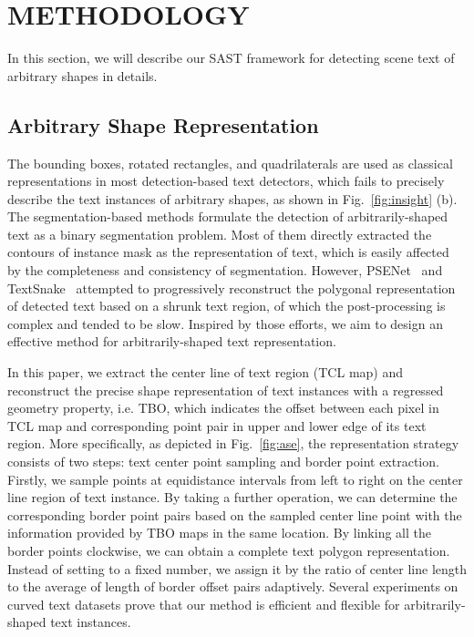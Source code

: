 \documentclass[sigconf]{acmart}
\begin{document}
\section{METHODOLOGY}
In this section, we will describe our SAST framework for detecting scene text of arbitrary shapes in details.

\subsection{Arbitrary Shape Representation}

The bounding boxes, rotated rectangles, and quadrilaterals are used as classical representations in most detection-based text detectors, which fails to precisely describe the text instances of arbitrary shapes, as shown in Fig.~\ref{fig:insight} (b). 
The segmentation-based methods formulate the detection of arbitrarily-shaped text as a binary segmentation problem. Most of them directly extracted the contours of instance mask as the representation of text, which is easily affected by the completeness and consistency of segmentation. However, PSENet~\cite{wang2019shape} and TextSnake~\cite{long2018textsnake} attempted to progressively reconstruct the polygonal representation of detected text based on a shrunk text region, of which the post-processing is complex and tended to be slow. Inspired by those efforts, we aim to design an effective method for arbitrarily-shaped text representation.
 


In this paper, we extract the center line of text region (TCL map) and reconstruct the precise shape representation of text instances with a regressed geometry property, i.e. TBO, which indicates the offset between each pixel in TCL map and corresponding point pair in upper and lower edge of its text region. More specifically, as depicted in Fig.~\ref{fig:ase}, the representation strategy consists of two steps: text center point sampling and border point extraction. Firstly, we sample  points at equidistance intervals from left to right on the center line region of text instance. By taking a further operation, we can determine the corresponding border point pairs based on the sampled center line point with the information provided by TBO maps in the same location. By linking all the border points clockwise, we can obtain a complete text polygon representation. Instead of setting  to a fixed number, we assign it by the ratio of center line length to the average of length of border offset pairs adaptively. Several experiments on curved text datasets prove that our method is efficient and flexible for arbitrarily-shaped text instances. 
\end{document}
